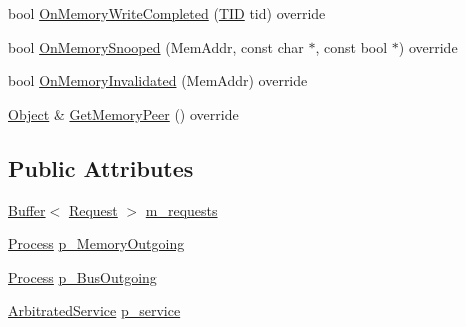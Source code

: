 \begin{DoxyCompactItemize}
\item 
bool \hyperlink{class_simulator_1_1drisc_1_1_i_o_direct_cache_access_a472d68272a889a901d2055deb75e84f7}{On\+Memory\+Write\+Completed} (\hyperlink{namespace_simulator_a483cc4ecee1736e895054617672cded5}{T\+I\+D} tid) override
\item 
bool \hyperlink{class_simulator_1_1drisc_1_1_i_o_direct_cache_access_aa53e4c80409dcdc612f3a861ffa3b689}{On\+Memory\+Snooped} (Mem\+Addr, const char $\ast$, const bool $\ast$) override
\item 
bool \hyperlink{class_simulator_1_1drisc_1_1_i_o_direct_cache_access_a586420dc80106909e9be0a6e1e5f4b43}{On\+Memory\+Invalidated} (Mem\+Addr) override
\item 
\hyperlink{class_simulator_1_1_object}{Object} \& \hyperlink{class_simulator_1_1drisc_1_1_i_o_direct_cache_access_ab73a53f8a39a0485399420a65911df97}{Get\+Memory\+Peer} () override
\end{DoxyCompactItemize}
\subsection*{Public Attributes}
\begin{DoxyCompactItemize}
\item 
\hyperlink{class_simulator_1_1_buffer}{Buffer}$<$ \hyperlink{struct_simulator_1_1drisc_1_1_i_o_direct_cache_access_1_1_request}{Request} $>$ \hyperlink{class_simulator_1_1drisc_1_1_i_o_direct_cache_access_a9510c423e5574932f9d847b2d3bd6c0d}{m\+\_\+requests}
\item 
\hyperlink{class_simulator_1_1_process}{Process} \hyperlink{class_simulator_1_1drisc_1_1_i_o_direct_cache_access_a052cdeea9f622e3e7ef306a90b251223}{p\+\_\+\+Memory\+Outgoing}
\item 
\hyperlink{class_simulator_1_1_process}{Process} \hyperlink{class_simulator_1_1drisc_1_1_i_o_direct_cache_access_aec357df702eb9c69337cb3323400b992}{p\+\_\+\+Bus\+Outgoing}
\item 
\hyperlink{class_simulator_1_1_arbitrated_service}{Arbitrated\+Service} \hyperlink{class_simulator_1_1drisc_1_1_i_o_direct_cache_access_afe74bccc44d774cb6a96bfa07a35ed63}{p\+\_\+service}
\end{DoxyCompactItemize}


